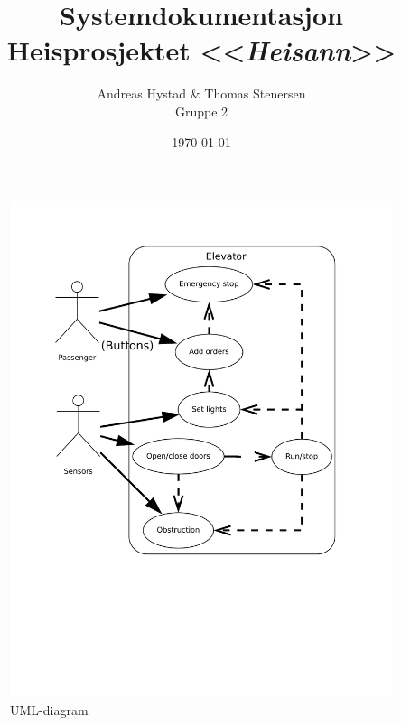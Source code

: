 \documentclass[a4paper,titlepage]{scrartcl}
\begin{document}
\title{Systemdokumentasjon \\ Heisprosjektet <<\emph{Heisann}>>}
\author{Andreas Hystad \& Thomas Stenersen \\ Gruppe 2}
\date{\today}
\maketitle

\begin{figure}[h]
\centering
\includegraphics[scale=.5]{uml_shait.pdf}
\caption{UML-diagram}
\end{figure}
\end{document}
